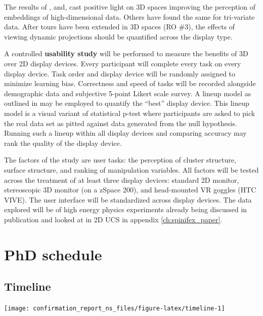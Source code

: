 \documentclass{monashthesis}
\begin{document}
The results of \textcite{wagner_filho_immersive_2018},
\textcite{nelson_xgobi_1998} and, \textcite{arms_benefits_1999} cast
positive light on 3D spaces improving the perception of embeddings of
high-dimensional data. Others have found the same for tri-variate data.
After tours have been extended in 3D spaces (RO \#3), the effects of
viewing dynamic projections should be quantified across the display
type.

A controlled \textbf{usability study} will be performed to measure the
benefits of 3D over 2D display devices. Every participant will complete
every task on every display device. Task order and display device will
be randomly assigned to minimize learning bias. Correctness and speed of
tasks will be recorded alongside demographic data and subjective 5-point
Likert scale survey. A lineup model as outlined in
\textcite{hofmann_graphical_2012} may be employed to quantify the
``best'' display device. This lineup model is a visual variant of
statistical p-test where participants are asked to pick the real data
set as pitted against data generated from the null hypothesis. Running
such a lineup within all display devices and comparing accuracy may rank
the quality of the display device.

The factors of the study are user tasks: the perception of cluster
structure, surface structure, and ranking of manipulation variables. All
factors will be tested across the treatment of at least three display
devices: standard 2D monitor, stereoscopic 3D monitor (on a zSpace 200),
and head-mounted VR goggles (HTC VIVE). The user interface will be
standardized across display devices. The data explored will be of high
energy physics experiments already being discussed in publication
\autocites{wang_visualizing_2018}{cook_dynamical_2018} and looked at in
2D UCS in appendix \ref{ch:spinifex_paper}.

\chapter{PhD schedule}\label{ch:timeline}

\section{Timeline}\label{timeline}

\begin{center}\texttt{[image: confirmation\_report\_ns\_files/figure-latex/timeline-1]} \end{center}
\end{document}
